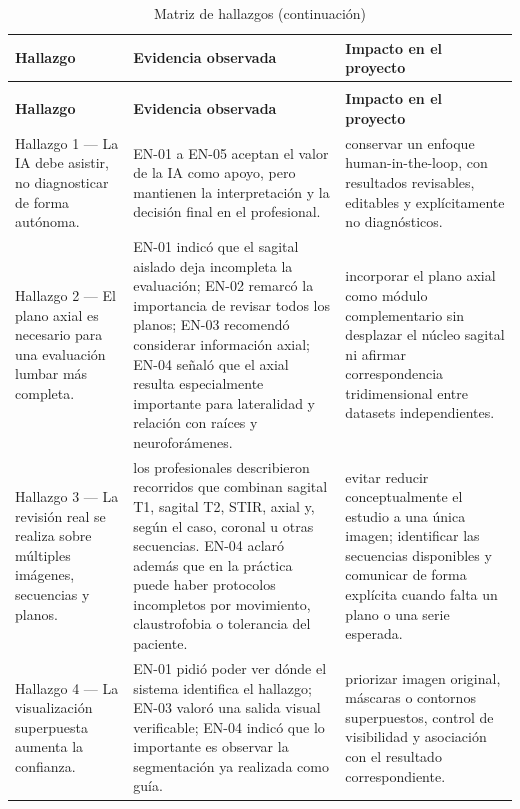 {\small
\setlength{\LTleft}{0pt}
\setlength{\LTright}{0pt}
\renewcommand{\arraystretch}{1.18}
\setlength{\tabcolsep}{3pt}
\begin{longtable}{>{\raggedright\arraybackslash}p{} >{\raggedright\arraybackslash}p{} >{\raggedright\arraybackslash}p{}}
\caption{Matriz de hallazgos}\label{tab:user-research-hallazgos}\\
\hline
\textbf{Hallazgo} & \textbf{Evidencia observada} & \textbf{Impacto en el proyecto} \\
\hline
\endfirsthead
\caption[]{Matriz de hallazgos (continuación)}\\
\hline
\textbf{Hallazgo} & \textbf{Evidencia observada} & \textbf{Impacto en el proyecto} \\
\hline
\endhead
\hline
\endfoot
Hallazgo 1 — La IA debe asistir, no diagnosticar de forma autónoma. & EN-01 a EN-05 aceptan el valor de la IA como apoyo, pero mantienen la interpretación y la decisión final en el profesional. & conservar un enfoque human-in-the-loop, con resultados revisables, editables y explícitamente no diagnósticos. \\
Hallazgo 2 — El plano axial es necesario para una evaluación lumbar más completa. & EN-01 indicó que el sagital aislado deja incompleta la evaluación; EN-02 remarcó la importancia de revisar todos los planos; EN-03 recomendó considerar información axial; EN-04 señaló que el axial resulta especialmente importante para lateralidad y relación con raíces y neuroforámenes. & incorporar el plano axial como módulo complementario sin desplazar el núcleo sagital ni afirmar correspondencia tridimensional entre datasets independientes. \\
Hallazgo 3 — La revisión real se realiza sobre múltiples imágenes, secuencias y planos. & los profesionales describieron recorridos que combinan sagital T1, sagital T2, STIR, axial y, según el caso, coronal u otras secuencias. EN-04 aclaró además que en la práctica puede haber protocolos incompletos por movimiento, claustrofobia o tolerancia del paciente. & evitar reducir conceptualmente el estudio a una única imagen; identificar las secuencias disponibles y comunicar de forma explícita cuando falta un plano o una serie esperada. \\
Hallazgo 4 — La visualización superpuesta aumenta la confianza. & EN-01 pidió poder ver dónde el sistema identifica el hallazgo; EN-03 valoró una salida visual verificable; EN-04 indicó que lo importante es observar la segmentación ya realizada como guía. & priorizar imagen original, máscaras o contornos superpuestos, control de visibilidad y asociación con el resultado correspondiente. \\

\end{longtable}}
